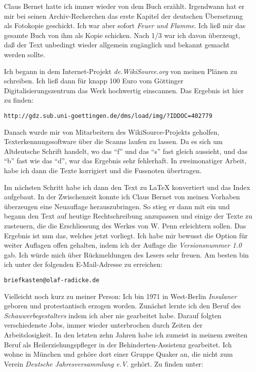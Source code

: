 \medskip

Claus Bernet hatte ich immer wieder von dem Buch erzählt. Irgendwann hat er mir
bei seinen Archiv-Recherchen das erste Kapitel der deutschen Übersetzung als
Fotokopie geschickt. Ich war aber sofort \textit{Feuer und
Flamme}. Ich ließ mir das gesamte Buch von ihm als Kopie schicken. Nach 1/3 war
ich davon überzeugt, daß der Text unbedingt wieder allgemein zugänglich und
bekannt gemacht werden sollte.

\medskip

Ich begann in dem Internet-Projekt \textit{de.WikiSource.org} von meinen Plänen
zu schreiben. Ich ließ dann für knapp 100 Euro vom Göttinger
Digitalisierungszentrum das Werk hochwertig einscannen. Das Ergebnis ist hier zu
finden:

\begin{center}
\texttt{http://gdz.sub.uni-goettingen.de/dms/load/img/?IDDOC=402779}
\end{center}

Danach wurde mir von Mitarbeitern des WikiSource-Projekts geholfen,
Texterkennungssoftware über die Scanns laufen zu lassen. Da es sich um
Altdeutsche Schrift handelt, wo das "`f"' und das "`s"' fast gleich aussieht,
und das "`b"' fast wie das "`d"', war das Ergebnis sehr fehlerhaft. In
zweimonatiger Arbeit, habe ich dann die Texte korrigiert und die Fussnoten
übertragen.

\medskip

Im nächsten Schritt habe ich dann den Text zu \LaTeX{} konvertiert und das Index
aufgebaut. In der Zwischenzeit konnte ich Claus Bernet von meinen Vorhaben überzeugen eine
Neuauflage herauszubringen. So stieg er dann mit ein und begann
den Text auf heutige Rechtschreibung anzupassen und einige der Texte zu
zusteuern, die die Erschliessung des Werkes von W. Penn erleichtern sollen.
Das Ergebnis ist nun das, welches jetzt vorliegt. Ich habe mir bewusst die
Option für weiter Auflagen offen gehalten, indem ich der Auflage die
\textit{Versionsnummer 1.0} gab. Ich würde mich über Rückmeldungen des Lesers
sehr freuen. Am besten bin ich unter der folgenden E-Mail-Adresse zu erreichen:

\begin{center}
\texttt{briefkasten@olaf-radicke.de}
\end{center}

Vielleicht noch kurz zu meiner Person: Ich bin 1971 in West-Berlin
\textit{Insulaner} geboren und protestantisch erzogen worden. Zunächst lernte
ich den Beruf des \textit{Schauwerbegestalters} indem ich aber nie gearbeitet
habe. Darauf folgten verschiedenste Jobs, immer wieder unterbrochen durch Zeiten
der Arbeitslosigkeit. In den letzten zehn Jahren habe ich zumeist in meinem
zweiten Beruf als Heilerziehungspfleger in der Behinderten-Assistenz gearbeitet.
Ich wohne in München und gehöre dort einer Gruppe Quaker an, die nicht zum
Verein \textit{Deutsche Jahresversammlung e.V}. gehört. Zu finden unter:

